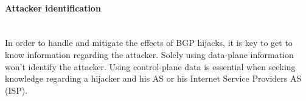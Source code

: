 \paragraph{Attacker identification}\mbox{}\\
In order to handle and mitigate the effects of BGP hijacks, it is key to get to know information regarding the attacker\cite{zhang2008ispy}. Solely using data-plane information won't identify the attacker. Using control-plane data is essential when seeking knowledge regarding a hijacker and his AS or his Internet Service Providers AS (ISP)\cite{shi2012detecting}.
